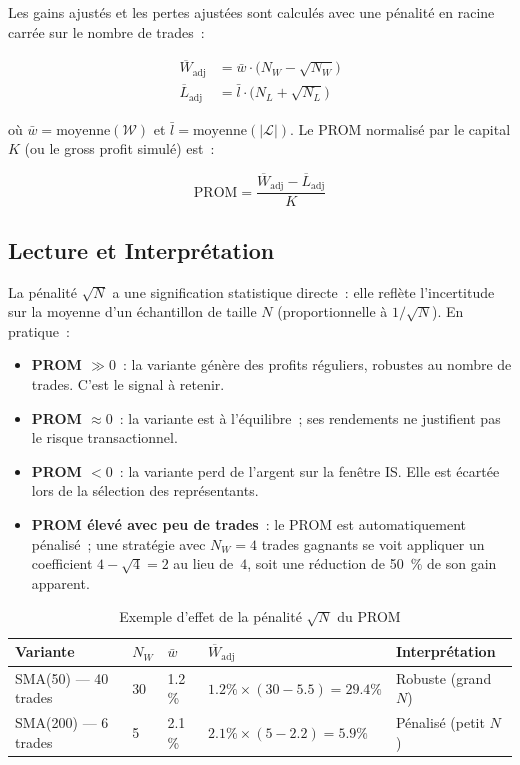 Les gains ajustés et les pertes ajustées sont calculés avec une pénalité
en racine carrée sur le nombre de trades~:

\begin{align}
\overline{W}_{\text{adj}} &= \bar{w} \cdot \bigl(N_W - \sqrt{N_W}\bigr)
\label{eq:prom_adj_wins}\\
\overline{L}_{\text{adj}} &= \bar{l} \cdot \bigl(N_L + \sqrt{N_L}\bigr)
\label{eq:prom_adj_losses}
\end{align}

où $\bar{w} = \text{moyenne}(\mathcal{W})$ et $\bar{l} = \text{moyenne}(|\mathcal{L}|)$.
Le PROM normalisé par le capital $K$ (ou le gross profit simulé) est~:

\begin{equation}
\boxed{\text{PROM} = \frac{\overline{W}_{\text{adj}} - \overline{L}_{\text{adj}}}{K}}
\label{eq:prom}
\end{equation}

\subsection{Lecture et Interprétation}

La pénalité $\sqrt{N}$ a une signification statistique directe~: elle reflète
l'incertitude sur la moyenne d'un échantillon de taille $N$ (proportionnelle à
$1/\sqrt{N}$). En pratique~:

\begin{itemize}
    \item \textbf{PROM $\gg 0$}~: la variante génère des profits réguliers,
    robustes au nombre de trades. C'est le signal à retenir.
    \item \textbf{PROM $\approx 0$}~: la variante est à l'équilibre~;
    ses rendements ne justifient pas le risque transactionnel.
    \item \textbf{PROM $< 0$}~: la variante perd de l'argent sur la fenêtre IS.
    Elle est écartée lors de la sélection des représentants.
    \item \textbf{PROM élevé avec peu de trades}~: le PROM est
    automatiquement pénalisé~; une stratégie avec $N_W = 4$ trades gagnants
    se voit appliquer un coefficient $4 - \sqrt{4} = 2$ au lieu de~$4$,
    soit une réduction de 50~\% de son gain apparent.
\end{itemize}

\begin{table}[H]
\centering
\caption{Exemple d'effet de la pénalité $\sqrt{N}$ du PROM}
\label{tab:prom_exemple}
\begin{tabularx}{\linewidth}{@{}lYYYY@{}}
\toprule
\textbf{Variante} & $N_W$ & $\bar{w}$ & $\overline{W}_{\text{adj}}$
& \textbf{Interprétation} \\
\midrule
SMA(50) — 40 trades & 30 & 1.2\,\% & $1.2\% \times (30 - 5.5) = 29.4\%$
& Robuste (grand $N$) \\
SMA(200) — 6 trades & 5 & 2.1\,\% & $2.1\% \times (5 - 2.2) = 5.9\%$
& Pénalisé (petit $N$) \\
\bottomrule
\end{tabularx}
\end{table}


